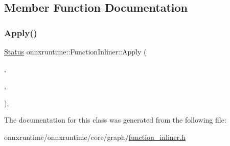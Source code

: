 \subsection{Member Function Documentation}
\mbox{\label{classonnxruntime_1_1FunctionInliner_aaa7e58cb85ad8529b138afaee6b1d149}} 
\subsubsection{\texorpdfstring{Apply()}{Apply()}}
{\footnotesize\ttfamily \mbox{\hyperlink{classonnxruntime_1_1common_1_1Status}{Status}} onnxruntime\+::\+Function\+Inliner\+::\+Apply (\begin{DoxyParamCaption}\item[{\mbox{\hyperlink{classonnxruntime_1_1GraphEditor}{onnxruntime\+::\+Graph\+Editor}}}]{,  }\item[{\mbox{\hyperlink{classonnxruntime_1_1Node}{onnxruntime\+::\+Node}} $\ast$}]{,  }\item[{bool $\ast$}]{ }\end{DoxyParamCaption})\hspace{0.3cm}{\ttfamily [inline]}, {\ttfamily [override]}}



The documentation for this class was generated from the following file\+:\begin{DoxyCompactItemize}
\item 
onnxruntime/onnxruntime/core/graph/\mbox{\hyperlink{function__inliner_8h}{function\+\_\+inliner.\+h}}\end{DoxyCompactItemize}
